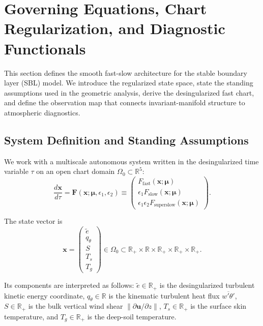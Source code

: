 \section{Governing Equations, Chart Regularization, and Diagnostic Functionals}

This section defines the smooth fast-slow architecture for the stable boundary layer (SBL) model. We introduce the regularized state space, state the standing assumptions used in the geometric analysis, derive the desingularized fast chart, and define the observation map that connects invariant-manifold structure to atmospheric diagnostics.

\subsection{System Definition and Standing Assumptions}

We work with a multiscale autonomous system written in the desingularized time variable $\tau$ on an open chart domain $\Omega_0 \subset \mathbb{R}^5$:
\begin{equation}
\frac{d\mathbf{x}}{d\tau}
= \mathbf{F}(\mathbf{x};\boldsymbol{\mu},\epsilon_1,\epsilon_2)
\equiv
\begin{pmatrix}
F_{\mathrm{fast}}(\mathbf{x};\boldsymbol{\mu}) \\
\epsilon_1 F_{\mathrm{slow}}(\mathbf{x};\boldsymbol{\mu}) \\
\epsilon_1\epsilon_2 F_{\mathrm{superslow}}(\mathbf{x};\boldsymbol{\mu})
\end{pmatrix}.
\end{equation}

The state vector is
\begin{equation}
\mathbf{x}
= \begin{pmatrix}
\tilde e \\
q_\theta \\
S \\
T_s \\
T_g
\end{pmatrix}
\in \Omega_0
\subset \mathbb{R}_+ \times \mathbb{R} \times \mathbb{R}_+ \times \mathbb{R}_+ \times \mathbb{R}_+.
\end{equation}

Its components are interpreted as follows: $\tilde e \in \mathbb{R}_+$ is the desingularized turbulent kinetic energy coordinate, $q_\theta \in \mathbb{R}$ is the kinematic turbulent heat flux $\overline{w'\theta'}$, $S \in \mathbb{R}_+$ is the bulk vertical wind shear $\lVert \partial \mathbf{u}/\partial z \rVert$, $T_s \in \mathbb{R}_+$ is the surface skin temperature, and $T_g \in \mathbb{R}_+$ is the deep-soil temperature.

